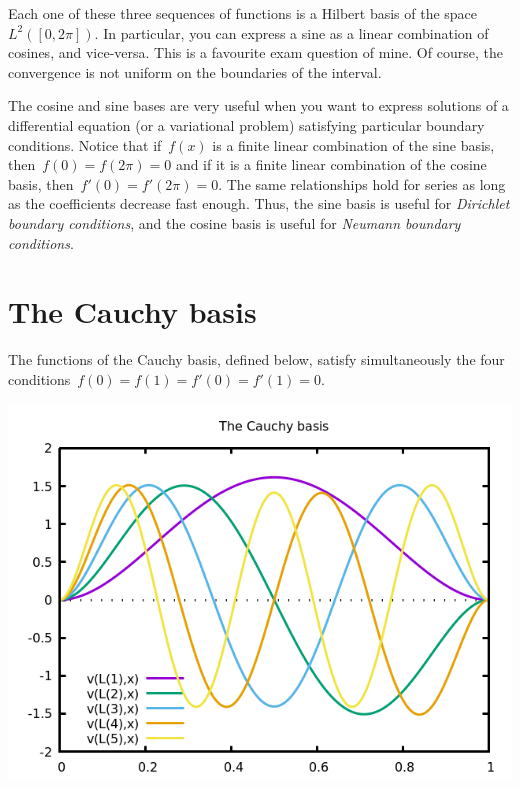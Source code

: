 Each one of these three sequences of functions is a Hilbert basis of the
space~$L^2([0,2\pi])$.  In particular, you can express a sine as a linear
combination of cosines, and vice-versa.  This is a favourite exam question of
mine.  Of course, the convergence is not uniform on the boundaries of the
interval.

The cosine and sine bases are very useful when you want to express solutions of
a differential equation (or a variational problem) satisfying particular
boundary conditions.  Notice that if~$f(x)$ is a finite linear combination of
the sine basis, then~$f(0)=f(2\pi)=0$ and if it is a finite linear combination
of the cosine basis, then~$f'(0)=f'(2\pi)=0$.  The same relationships hold for
series as long as the coefficients decrease fast enough.  Thus, the sine basis
is useful for \emph{Dirichlet boundary conditions}, and the cosine basis is
useful for \emph{Neumann boundary conditions}.


\section{The Cauchy basis}

The functions of the Cauchy basis, defined below, satisfy simultaneously the
four conditions~$f(0)=f(1)=f'(0)=f'(1)=0$.

\includegraphics{cauchy.png}



